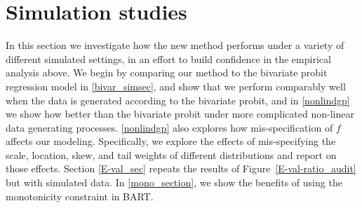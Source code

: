 \documentclass[aoas,preprint, 11pt, dvipsnames, table, x11name]{imsart}
\theoremstyle{remark}
\begin{document}
	\section{Simulation studies}\label{sim_study}
	In this section we investigate how the new method performs under a variety of different simulated settings, in an effort to build confidence in the empirical analysis above. We begin by comparing our method to the bivariate probit regression model in \ref{bivar_simsec}, and show that we perform comparably well when the data is generated according to the bivariate probit, and in \ref{nonlindgp} we show how better than the bivariate probit under more complicated non-linear data generating processes. \ref{nonlindgp} also explores how mis-specification of $f$ affects our modeling.  Specifically, we explore the effects of mis-specifying the scale, location, skew, and tail weights of different distributions and report on those effects.  Section \ref{E-val_sec} repeats the results of Figure~\ref{E-val-ratio_audit} but with simulated data.  In \ref{mono_section}, we show the benefits of using the monotonicity constraint in BART.
	
\end{document}
